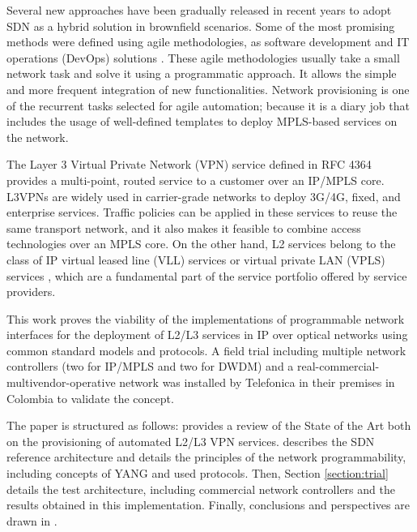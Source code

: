 \documentclass[10pt, conference]{IEEEtran}
\begin{document}
Several new approaches have been gradually released in recent years to adopt SDN as a hybrid solution in brownfield scenarios. Some of the most promising methods were defined using agile methodologies, as software development and IT operations (DevOps) solutions \cite{choi2018agile}. 
These agile methodologies usually take a small network task and solve it using a programmatic approach. It allows the simple and more frequent integration of new functionalities. Network provisioning is one of the recurrent tasks selected for agile automation; because it is a diary job that includes the usage of well-defined templates to deploy MPLS-based services on the network.

The Layer 3 Virtual Private Network (VPN) service defined in RFC 4364 \cite{rfc4364} provides a multi-point, routed service to a customer over an IP/MPLS core. L3VPNs are widely used in carrier-grade networks to deploy 3G/4G, fixed, and enterprise services. Traffic policies can be applied in these services to reuse the same transport network, and it also makes it feasible to combine access technologies over an MPLS core. On the other hand, L2 services belong to the class of IP virtual leased line (VLL) services or virtual private LAN (VPLS) services \cite{andersson2006framework}, which are a fundamental part of the service portfolio offered by service providers. 

This work proves the viability of the implementations of programmable network interfaces for the deployment of L2/L3 services in IP over optical networks using common standard models and protocols. A field trial including multiple network controllers (two for IP/MPLS and two for DWDM) and a real-commercial-multivendor-operative network was installed by Telefonica in their premises in Colombia to validate the concept.

The paper is structured as follows:  provides a review of the State of the Art both on the provisioning of automated L2/L3 VPN services.  describes the SDN reference architecture and details the principles of the network programmability, including concepts of YANG and used protocols. Then, Section \ref{section:trial} details the test architecture, including commercial network controllers and the results obtained in this implementation. Finally, conclusions and perspectives are drawn in .    

\end{document}
